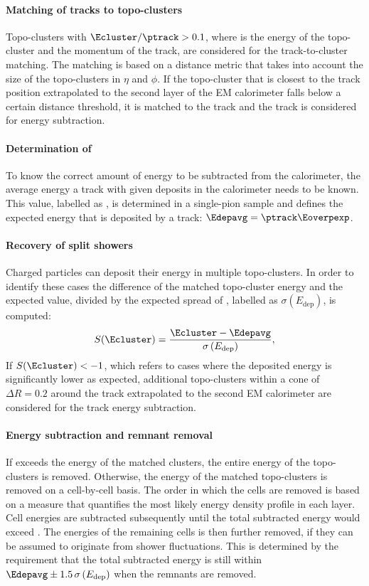 \paragraph{Matching of tracks to topo-clusters} Topo-clusters with $\Ecluster / \ptrack > 0.1$, where \Ecluster is the energy of the topo-cluster and \ptrack the momentum of the track, are considered for the track-to-cluster matching. The matching is based on a distance metric that takes into account the size of the topo-clusters in $\eta$ and $\phi$. If the topo-cluster that is closest to the track position extrapolated to the second layer of the EM calorimeter falls below a certain distance threshold, it is matched to the track and the track is considered for energy subtraction.

\paragraph{Determination of \Eoverpexp} To know the correct amount of energy to be subtracted from the calorimeter, the average energy a track with given \pT deposits in the calorimeter needs to be known. This value, labelled as \Eoverpexp, is determined in a single-pion sample and defines the expected energy that is deposited by a track: $\Edepavg = \ptrack \Eoverpexp$.

\paragraph{Recovery of split showers} Charged particles can deposit their energy in multiple topo-clusters. In order to identify these cases the difference of the matched topo-cluster energy and the expected value, divided by the expected spread of \Edepavg, labelled as $\sigma \left(E_{\text{dep}}\right)$, is computed:
\begin{equation}
    S(\Ecluster) = \frac{ \Ecluster - \Edepavg}{\sigma \left(E_{\text{dep}}\right)},
\end{equation}
If $S(\Ecluster)  < -1$, which refers to cases where the deposited energy is significantly lower as expected, additional topo-clusters within a cone of $\Delta R = 0.2$ around the track extrapolated to the second EM calorimeter are considered for the track energy subtraction.

\paragraph{Energy subtraction and remnant removal} If \Edepavg exceeds the energy of the matched clusters, the entire energy of the topo-clusters is removed. Otherwise, the energy of the matched topo-clusters is removed on a cell-by-cell basis. The order in which the cells are removed is based on a measure that quantifies the most likely energy density profile in each layer. Cell energies are subtracted subsequently until the total subtracted energy would exceed \Edepavg. The energies of the remaining cells is then further removed, if they can be assumed to originate from shower fluctuations. This is determined by the requirement that the total subtracted energy is still within $\Edepavg \pm 1.5\,\sigma \left(E_{\text{dep}}\right)$ when the remnants are removed.

